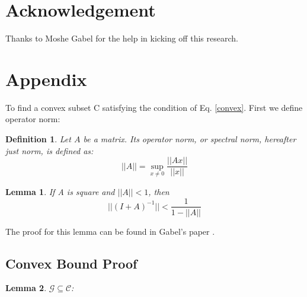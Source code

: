 \documentclass[11pt,twocolumn,varwidth=true,a4paper,fleqn]{article}
\newtheorem{lemma}{Lemma}
\newtheorem{definition}{Definition}
\begin{document}
\section*{Acknowledgement}
Thanks to Moshe Gabel for the help in kicking off this research.




\appendix
\section{Appendix} \label{AppendixA}
To find a convex subset C satisfying the condition of Eq. \ref{convex}. 
First we define operator norm:
\begin{definition}
Let $A$ be a matrix. Its operator norm, or
spectral norm, hereafter just norm, is defined as:
\begin{equation*}
||A|| = \sup_{x \neq 0}\frac{||Ax||}{||x||} 
\end{equation*}
\end{definition}

\begin{lemma} \label{lemma:newman}
If A is square and $||A|| < 1$, then
\begin{equation*}
||(I+A)^{-1}|| < \frac{1}{1-||A||}
\end{equation*}
\end{lemma}
The proof for this lemma can be found in Gabel's paper
\cite{gabel2015monitoring}.

\subsection{Convex Bound Proof}
\begin{lemma}
$\mathcal{G} \subseteq \mathcal{C}$:
\end{lemma}
\end{document}
